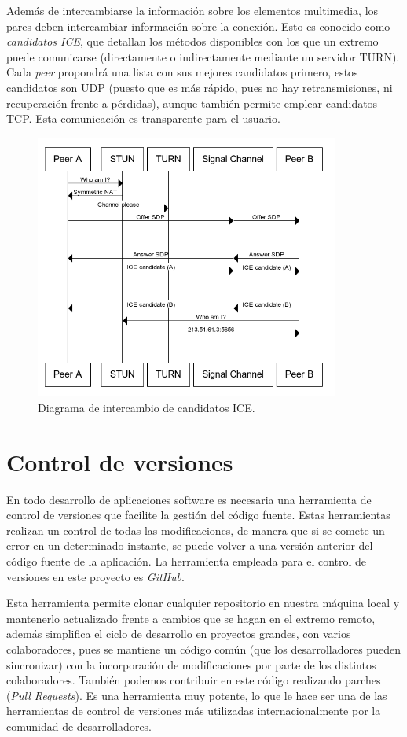 \documentclass[a4paper, 12pt]{book}
\begin{document}
Además de intercambiarse la información sobre los elementos multimedia, los pares deben intercambiar información sobre la conexión. Esto es conocido como \textit{candidatos ICE}, que detallan los métodos disponibles con los que un extremo puede comunicarse (directamente o indirectamente mediante un servidor TURN). Cada \textit{peer} propondrá una lista con sus mejores candidatos primero, estos candidatos son UDP (puesto que es más rápido, pues no hay retransmisiones, ni recuperación frente a pérdidas), aunque también permite emplear candidatos TCP. Esta comunicación es transparente para el usuario.

\begin{figure}[H]
	\centering
    \includegraphics[width=10cm]{img/ice_diagram.png}
    \caption{Diagrama de intercambio de candidatos ICE.}
    \label{figura:nocss_vs_css}
\end{figure}

\section{Control de versiones}
\label{sec:control-de-versiones}

En todo desarrollo de aplicaciones software es necesaria una herramienta de control de versiones que facilite la gestión del código fuente. Estas herramientas realizan un control de todas las modificaciones, de manera que si se comete un error en un determinado instante, se puede volver a una versión anterior del código fuente de la aplicación. La herramienta empleada para el control de versiones en este proyecto es \emph{GitHub}.

Esta herramienta permite clonar cualquier repositorio en nuestra máquina local y mantenerlo actualizado frente a cambios que se hagan en el extremo remoto, además simplifica el ciclo de desarrollo en proyectos grandes, con varios colaboradores, pues se mantiene un código común (que los desarrolladores pueden sincronizar) con la incorporación de modificaciones por parte de los distintos colaboradores. También podemos contribuir en este código realizando parches (\emph{Pull Requests}). Es una herramienta muy potente, lo que le hace ser una de las herramientas de control de versiones más utilizadas internacionalmente por la comunidad de desarrolladores.
\end{document}
